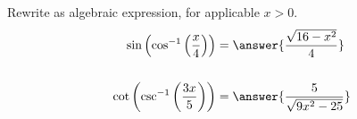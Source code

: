 \documentclass{ximera}
\author{Bobby Ramsey}
\begin{document}
\begin{exercise}
Rewrite as algebraic expression, for applicable $x>0$.
\begin{align*}
	\sin\left( \cos^{-1}\left(\frac{x}{4}\right) \right) &= \answer{\frac{\sqrt{16-x^2}}{4}} \\ \\
	\cot\left( \csc^{-1}\left( \frac{3x}{5} \right) \right) &= \answer{\frac{5}{\sqrt{9x^2-25}}}
\end{align*}	


\end{exercise}
\end{document}
